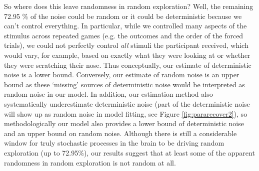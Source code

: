 \documentclass[12pt]{article}
\begin{document}
	So where does this leave randomness in random exploration? Well, the remaining 72.95 \% of the noise could be random or it could be deterministic because we can't control everything. In particular, while we controlled many aspects of the stimulus across repeated games (e.g. the outcomes and the order of the forced trials), we could not perfectly control {\it all} stimuli the participant received, which would vary, for example, based on exactly what they were looking at or whether they were scratching their nose. Thus conceptually, our estimate of deterministic noise is a lower bound. Conversely, our estimate of random noise is an upper bound as these `missing' sources of deterministic noise would be interpreted as random noise in our model. In addition, our estimation method also systematically underestimate deterministic noise (part of the deterministic noise will show up as random noise in model fitting, see Figure \ref{fig:pararecover2}), so methodologically our model also provides a lower bound of deterministic noise and an upper bound on random noise. Although there is still a considerable window for truly stochastic processes in the brain to be driving random exploration (up to 72.95\%), our results suggest that at least some of the apparent randomness in random exploration is not random at all. 
\end{document}
